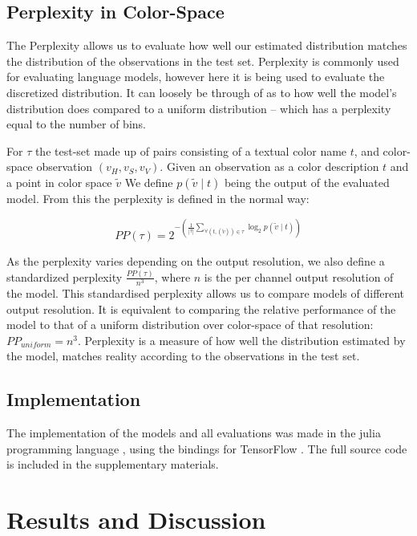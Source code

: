 \documentclass[11pt,letterpaper]{article}
\newcommand{\parencite}{\cite}
\begin{document}
\subsection{Perplexity in Color-Space}
The Perplexity allows us to evaluate how well our estimated distribution matches the distribution of the observations in the test set.
Perplexity is commonly used for evaluating language models, however here it is being used to evaluate the discretized distribution.
It can loosely be through of as to how well the model's distribution does compared to a uniform distribution -- which has a perplexity equal to the number of bins.


For $\tau$ the test-set made up of pairs consisting of a textual color name $t$, and color-space observation $(v_{H}, v_{S}, v_{V})$.
Given an observation as a color description $t$ and a point in color space $\tilde{v}$
We define $p(\tilde{v}\mid t)$ being the output of the evaluated model.
From this the perplexity is defined in the normal way:

\[
 PP(\tau) = 2^{-\left(
 	\displaystyle\frac{1}{|\tau|} 
 	\displaystyle\sum_{
	 		\forall(t,(\tilde{v})) \in \tau}
 	 \log_2 p(\tilde{v}\mid t)\right)}
\]


As the perplexity varies depending on the output resolution,
we also define a standardized perplexity $\frac{PP(\tau)}{n^3}$, where $n$ is the per channel output resolution of the model.
This standardised perplexity allows us to compare models of different output resolution.
It is equivalent to comparing the relative performance of the model to that of a uniform distribution over color-space of that resolution: $PP_{uniform}=n^3$.
Perplexity is a measure of how well the distribution estimated by the model, matches reality according to the observations in the test set.



\subsection{Implementation}
The implementation of the models and all evaluations was made in the julia programming language \parencite{Julia},
using the bindings for TensorFlow \parencite{tensorflow2015-whitepaper}.
The full source code is included in the supplementary materials.

\section{Results and Discussion}\label{sec:results-and-discussion}
\end{document}
